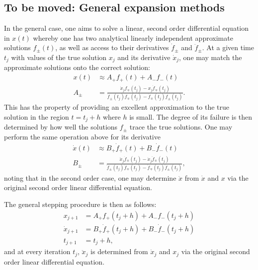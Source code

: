 \subsection{To be moved: General expansion methods}
In the general case, one aims to solve a linear, second order differential equation in \(x(t)\) whereby one has two analytical linearly independent approximate solutions \(f_\pm(t)\), as well as access to their derivatives \(\dot{f}_\pm\) and \(\ddot{f}_\pm\). At a given time \(t_j\) with values of the true solution \(x_j\) and its derivative \(\dot{x}_j\), one may match the approximate solutions onto the correct solution:
\begin{align}
    x(t) &\approx  A_+ f_+(t) + A_- f_-(t) \\
    A_\pm &= \frac{\dot{x}_j f_\mp(t_j) - x_j \dot{f}_\mp(t_j) }{\dot{f}_\pm(t_j) f_\mp(t_j) - \dot{f}_\mp(t_j) f_\pm(t_j)}.
\end{align}
This has the property of providing an excellent approximation to the true solution in the region \(t=t_j + h\) where \(h\) is small. The degree of its failure is then determined by how well the solutions \(f_\pm\) trace the true solutions. 
One may perform the same operation above for its derivative
\begin{align}
    \dot{x}(t) &\approx  B_+ \dot{f}_+(t) + B_- \dot{f}_-(t) \\
    B_\pm &= \frac{\ddot{x}_j \dot{f}_\mp(t_j) - \dot{x}_j \ddot{f}_\mp(t_j) }{\ddot{f}_\pm(t_j) \dot{f}_\mp(t_j) - \ddot{f}_\mp(t_j) \ddot{f}_\pm(t_j)}, 
\end{align}
noting that in the second order case, one may determine \(\ddot{x}\) from \(\dot{x}\) and \(x\) via the original second order linear differential equation.

The general stepping procedure is then as follows:
\begin{align}
  x_{j+1} &= A_+ f_+(t_j + h) + A_- f_-(t_j + h)
  \label{eqn:x_step} \\
  \dot{x}_{j+1} &= B_+ \dot{f}_+(t_j + h) + B_- \dot{f}_-(t_j + h)
  \label{eqn:x_dot_step} \\
  t_{j+1} &= t_j+h,
  \label{eqn:t_step}
\end{align}
and at every iteration \(t_j\), \(\ddot{x}_j\) is determined from \(\dot{x}_j\) and \(x_j\) via the original second order linear differential equation.

